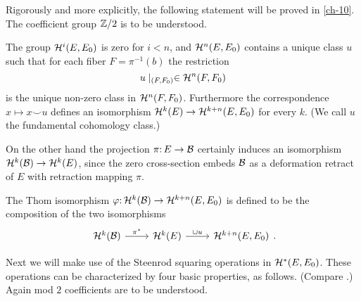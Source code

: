Rigorously and more explicitly, the following statement will be proved in \cref{ch-10}. The coefficient group $\mathbb{Z} / 2$ is to be understood.

\begin{theorem}\label{thm-8-1}
	The group $\mathcal{H}^{i}(E, E_{0})$ is zero for $i< n $, and $\mathcal{H}^{ n }(E, E_{0})$ contains a unique class $u$ such that for each fiber $F=\pi^{-1}(b)$ the restriction
	\[
	u \mid _{(F, F_{0})} \in \mathcal{H}^{ n }(F, F_{0})
	\]
	is the unique non-zero class in $\mathcal{H}^{ n }(F, F_{0})$. Furthermore the correspondence $x \mapsto x \smile u$ defines an isomorphism $\mathcal{H}^{k}(E) \rightarrow \mathcal{H}^{k+ n }(E, E_{0})$ for every $k$. (We call $u$ the fundamental cohomology class.)
\end{theorem}

On the other hand the projection $\map{\pi}{E}{\B }$ certainly induces an isomorphism $\mathcal{H}^{k}(\mathcal{B} ) \rightarrow \mathcal{H}^{k}(E)$, since the zero cross-section embeds $\mathcal{B} $ as a deformation retract of $E$ with retraction mapping $\pi$.

\begin{definition}\label{def:8-2}
	The Thom isomorphism $\map{\varphi}{\homology^{k}(\B )}{\homology^{k+ n }(E, E_{0})}$ is defined to be the composition of the two isomorphisms
	\[
	\begin{tikzcd}
		\homology^{k}(\B ) \arrow[r, "\pi^{*}"] & \homology^{k}(E) \arrow[r, "\cup u"] & \homology^{k+ n }(E, E_{0})
	\end{tikzcd}.
	\]
\end{definition}

Next we will make use of the Steenrod squaring operations in $\mathcal{H}^{*}(E, E_{0})$. These operations can be characterized by four basic properties, as follows. (Compare \cite{80}.) Again mod $2$ coefficients are to be understood.

